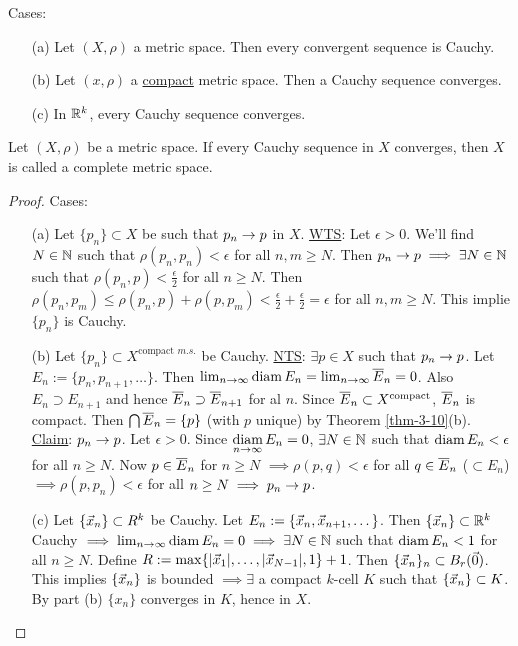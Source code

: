 \documentclass[]{article}
\begin{document}
\begin{theorem}
	Cases:
	\begin{enumerate}
		\item[(a)] Let $(X,\rho)$ a metric space. Then every convergent sequence is Cauchy.
		\item[(b)] Let $(x,\rho)$ a \ul{compact} metric space. Then a Cauchy sequence converges.
		\item[(c)] In $\mathbb{R}^k$, every Cauchy sequence converges.
	\end{enumerate}
\end{theorem}
\begin{definition}
	Let $(X,\rho)$ be a metric space. If every Cauchy sequence in $X$ converges, then $X$ is called a complete metric space.
\end{definition}
\begin{proof}
	Cases:
	\begin{enumerate}
		\item[(a)] Let $\{p_n\}\subset X$ be such that \ul{$p_n\rightarrow p$} in $X$.
			\ul{WTS}: Let $\epsilon > 0$. We'll find $N\in\mathbb{N}$ such that $\rho(p_n,p_n) < \epsilon$ for all $n,m\geq N$.
			Then $p_n\rightarrow p \implies \exists N\in\mathbb{N}$ such that $\rho(p_n,p) < \frac{\epsilon}{2}$ for all $n\geq N$.
			Then $\rho(p_n,p_m) \leq \rho(p_n,p) + \rho(p,p_m) < \frac{\epsilon}{2} + \frac{\epsilon}{2} = \epsilon$ for all $n,m\geq N$.
			This implie $\{p_n\}$ is Cauchy.
		\item[(b)] Let $\{p_n\}\subset X^{\text{compact }m.s.}$ be Cauchy.
			\ul{NTS}: $\exists p\in X$ such that $p_n\rightarrow p$.
			Let $E_n:=\{p_n,p_{n+1},\dots\}$.
			Then $\lim_{n\rightarrow\infty} \text{diam}\,E_n = \lim_{n\rightarrow\infty}\overline{E}_n = 0$.
			Also $E_n\supset E_{n+1}$ and hence $\overline{E}_n\supset \overline{E}_{n+1}$ for al $n$.
			Since $\overline{E}_n\subset X^{\text{compact}}$, $\overline{E}_n$ is compact.
			Then $\bigcap \overline{E}_n = \{p\}$ (with $p$ unique) by Theorem \ref{thm-3-10}(b).
			\ul{Claim}: $p_n\rightarrow p$.
			Let $\epsilon > 0$. Since $\underset{n\rightarrow\infty}{\text{diam}}\,E_n = 0$, $\exists N\in\mathbb{N}$ such that $\text{diam}\,E_n < \epsilon$ for all $n\geq N$.
			Now $p\in\overline{E}_n$ for \ul{$n\geq N$} $\implies \rho(p,q) < \epsilon$ for all $q\in\overline{E}_n$ ($\subset E_n$) $\implies \rho(p,p_n)<\epsilon$ for all $n\geq N \implies p_n\rightarrow p$.
		\item[(c)] Let $\{\vec{x}_n\}\subset R^k$ be Cauchy. Let $E_n:=\{\vec{x}_n,\vec{x}_{n+1},\dots\}$.
			Then $\{\vec{x}_n\}\subset \mathbb{R}^k$ Cauchy $\implies \lim_{n\rightarrow\infty}\text{diam}\,E_n = 0 \implies \exists N\in\mathbb{N}$ such that $\text{diam}\,E_n < 1$ for all $n\geq N$.
			Define $R := \max\{|\vec{x}_1|,\dots,|\vec{x}_{N-1}|,1\}+1$.
			Then $\{\vec{x}_n\}_n\subset B_r(\vec{0})$. This implies $\{\vec{x}_n\}$ is bounded $\implies \exists$ a compact $k$-cell $K$ such that $\{\vec{x}_n\}\subset K$.
			By part (b) $\{x_n\}$ converges in $K$, hence in $X$.
	\end{enumerate}
\end{proof}
\end{document}
